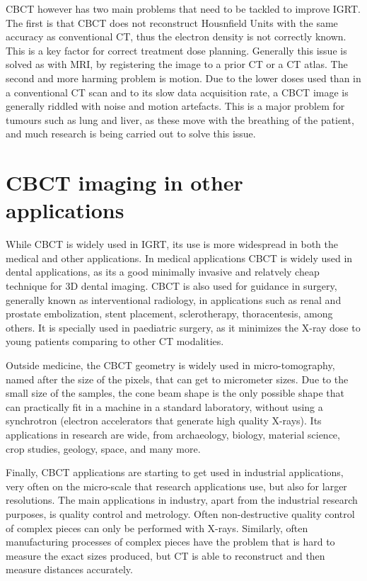 CBCT however has two main problems that need to be tackled to improve IGRT. The first is that CBCT does not reconstruct Housnfield Units with the same accuracy as conventional CT, thus the electron density is not correctly known. This is a key factor for correct treatment dose planning. Generally this issue is solved as with MRI, by registering the image to a prior CT or a CT atlas. The second and more harming problem is motion. Due to the lower doses used than in a conventional CT scan and to its slow data acquisition rate, a CBCT image is generally riddled with noise and motion artefacts. This is a major problem for tumours such as lung and liver, as these move with the breathing of the patient, and much research is being carried out to solve this issue.


\section{CBCT imaging in other applications}

While CBCT is widely used in IGRT, its use is more widespread in both the medical and other applications. In medical applications CBCT is widely used in dental applications\cite{alamri2012applications}, as its a good minimally invasive and relatvely cheap technique for 3D dental imaging. CBCT is also used for guidance in surgery, generally known as interventional radiology, in applications such as renal and prostate embolization\cite{floridi2014c}, stent placement, sclerotherapy, thoracentesis\cite{Acord2017}, among others. It is specially used in paediatric surgery, as it minimizes the X-ray dose to young patients comparing to other CT modalities.

Outside medicine, the CBCT geometry is widely used in micro-tomography, named after the size of the pixels, that can get to micrometer sizes. Due to the small size of the samples, the cone beam shape is the only possible shape that can practically fit in a machine in a standard laboratory, without using a synchrotron (electron accelerators that generate high quality X-rays). Its applications in research are wide, from archaeology, biology, material science, crop studies, geology, space, and many more.

Finally, CBCT applications are starting to get used in industrial applications, very often on the micro-scale that research applications use, but also for larger resolutions. The main applications in industry, apart from the industrial research purposes, is quality control and metrology. Often non-destructive quality control of complex pieces can only be performed with X-rays. Similarly, often manufacturing processes of complex pieces have the problem that is hard to measure the exact sizes produced, but CT is able to reconstruct and then measure distances accurately.
